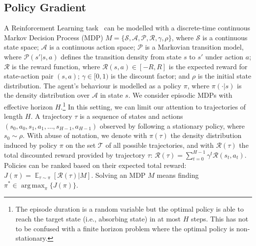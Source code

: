 \documentclass{article}
\makeatletter
\theoremstyle{remark}
\theoremstyle{definition}
\DeclareRobustCommand{\ie}{i.e.,\@\xspace}
\DeclareMathOperator*{\argmax}{arg\,max}
\DeclareMathOperator*{\EV}{\mathbb{E}}
\newcommand{\EVV}[2][\ppvect \in \ppspace]{\EV_{#1}\left[{#2}\right]}
\newcommand{\Aspace}{\mathcal{A}}
\newcommand{\Sspace}{\mathcal{S}}
\newcommand{\Tspace}{\mathcal{T}}
\newcommand{\Transition}{\mathcal{P}}
\newcommand{\Reward}{\mathcal{R}}
\makeatother
\begin{document}
\subsection{Policy Gradient}\label{subsec:PolicyGradient}
A Reinforcement Learning task~\citep{sutton1998reinforcement} can be modelled with a discrete-time continuous Markov Decision Process (MDP) $M = \{\Sspace,\Aspace,\Transition,\Reward,\gamma,\rho\}$, where $\Sspace$ is a continuous state space; $\Aspace$ is a continuous action space; $\Transition$ is a Markovian transition model, where $\Transition(s'|s,a)$ defines the transition density from state $s$ to $s'$ under action $a$; $\Reward$ is the reward function, where $\Reward(s,a) \in [-R,R]$ is the expected reward for state-action pair $(s,a)$;
$\gamma\in[0,1)$ is the discount factor; and $\rho$ is the initial state distribution.
The agent's behaviour is modelled as a policy $\pi$, where $\pi(\cdot|s)$ is the density distribution over $\Aspace$ in state $s$.
We consider episodic MDPs with effective horizon $H$.\footnote{The episode duration is a random variable but the optimal policy is able to reach the target state (\ie absorbing state) in at most $H$ steps. This has not to be confused with a finite horizon problem where the optimal policy is non-stationary.} In this setting, we can limit our attention to trajectories of length $H$. A trajectory $\tau$ is a sequence of states and actions $(s_0,a_0,s_1,a_1,\dots,s_{H-1},a_{H-1})$ observed by following a stationary policy, where $s_0 \sim \rho$.
With abuse of notation, we denote with $\pi(\tau)$ the density distribution induced by policy $\pi$ on the set $\Tspace$ of all possible trajectories, and with $\Reward(\tau)$ the total discounted reward provided by trajectory $\tau$:
%
$\Reward(\tau) = \sum_{t=0}^{H-1}\gamma^t\Reward(s_t,a_t).$
%
Policies can be ranked based on their expected total reward: $J(\pi) = \EVV[\tau \sim \pi]{\Reward(\tau)|M}$.
Solving an MDP $M$ means finding $\pi^* \in \argmax_{\pi} \{J(\pi)\}$.
\end{document}
